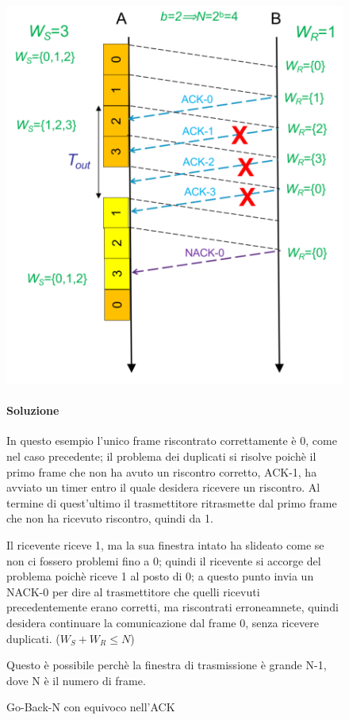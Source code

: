 \begin{figure}[htbp]
\begin{minipage}{0.45\textwidth}
    \end{minipage}
\end{figure}


\begin{figure}[htbp]
    \centering
     \begin{minipage}{0.45\textwidth}
        \includegraphics[width=\linewidth]{images/ackequivoco2.png}
        \caption{Go-Back-N con equivoco nell'ACK}

    \end{minipage}
    \hfill
    \begin{minipage}{0.5\textwidth}
        \paragraph{Soluzione} In questo esempio l'unico frame riscontrato correttamente è 0, come nel caso precedente; il problema dei duplicati si risolve poichè il primo frame che non ha avuto un riscontro corretto, ACK-1, ha avviato un timer entro il quale desidera ricevere un riscontro. 
        Al termine di quest'ultimo il trasmettitore ritrasmette dal primo frame che non ha ricevuto riscontro, quindi da 1.

        Il ricevente riceve 1, ma la sua finestra intato ha slideato come se non ci fossero problemi fino a 0; quindi il ricevente si accorge del problema poichè riceve 1 al posto di 0; a questo punto invia un NACK-0 per dire al trasmettitore che quelli ricevuti precedentemente erano corretti, ma riscontrati erroneamnete, quindi desidera continuare la comunicazione dal frame 0, senza ricevere duplicati. ($W_S + W_R \leq N$)

        Questo è possibile perchè la finestra di trasmissione è grande N-1, dove N è il numero di frame.

        
    \end{minipage}%
\end{figure}
